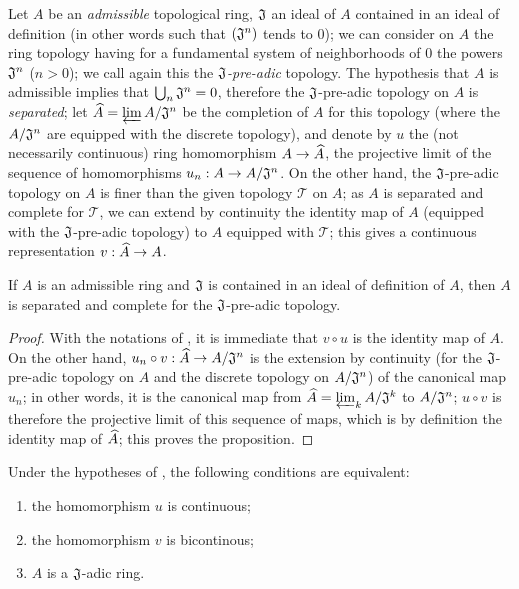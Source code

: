 \begin{env}[7.2.3]
\label{0.7.2.3}
Let $A$ be an \emph{admissible} topological ring, $\mathfrak{J}$ an ideal of $A$
contained in an ideal of definition (in other words  such that
$(\mathfrak{J}^n)$ tends to $0$); we can consider on $A$ the ring topology
having for a fundamental system of neighborhoods of $0$ the powers
$\mathfrak{J}^n$ ($n>0$); we call again this the \emph{$\mathfrak{J}$-pre-adic}
topology. The hypothesis that $A$ is admissible implies that
$\bigcup_n\mathfrak{J}^n=0$, therefore the $\mathfrak{J}$-pre-adic topology on
$A$ is \emph{separated}; let $\widehat{A}=\varprojlim A/\mathfrak{J}^n$ be the
completion of $A$ for this topology (where the $A/\mathfrak{J}^n$ are equipped
with the discrete topology), and denote by $u$ the (not necessarily continuous)
ring homomorphism $A\to\wh{A}$, the projective limit of the sequence of
homomorphisms $u_n:A\to A/\fk{J}^n$. On the other hand, the
$\mathfrak{J}$-pre-adic topology on $A$ is finer than the given topology
$\mathcal{T}$ on $A$; as $A$ is separated and complete for $\mathcal{T}$, we can
extend by continuity the identity map of $A$ (equipped with the
$\mathfrak{J}$-pre-adic topology) to $A$ equipped with $\mathcal{T}$; this
gives a continuous representation $v:\wh{A}\to A$.
\end{env}

\begin{prop}[7.2.4]
\label{0.7.2.4}
If $A$ is an admissible ring and $\mathfrak{J}$ is contained in an ideal of
definition of $A$, then $A$ is separated and complete for the
$\mathfrak{J}$-pre-adic topology.
\end{prop}

\begin{proof}
\label{proof-0.7.2.4}
With the notations of , it is immediate that
$v\circ u$ is the identity map of $A$. On the other hand,
$u_n\circ v:\wh{A}\to A/\fk{J}^n$ is the extension by continuity (for
the $\mathfrak{J}$-pre-adic topology on $A$ and the discrete topology on
$A/\mathfrak{J}^n$) of the canonical map $u_n$; in other words, it is the
canonical map from $\widehat{A}=\varprojlim_k A/\mathfrak{J}^k$ to
$A/\mathfrak{J}^n$; $u\circ v$ is therefore the projective limit of this
sequence of maps, which is by definition the identity map of
$\widehat{A}$; this proves the proposition.
\end{proof}

\begin{cor}[7.2.5]
\label{0.7.2.5}
Under the hypotheses of , the following conditions are
equivalent:
\begin{enumerate}[label=\emph{(\alph*)}]
  \item the homomorphism $u$ is continuous;
  \item the homomorphism $v$ is bicontinous;
  \item $A$ is a $\mathfrak{J}$-adic ring.
\end{enumerate}
\end{cor}

